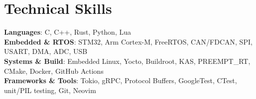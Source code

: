 \documentclass[letterpaper,11pt]{article}
\begin{document}
\section{Technical Skills}
\begin{itemize}[leftmargin=0.15in, label={}]
	\small{\item{
		      \textbf{Languages}{: C, C++, Rust, Python, Lua} \\
		      \textbf{Embedded \& RTOS}{: STM32, Arm Cortex-M, FreeRTOS, CAN/FDCAN, SPI, USART, DMA, ADC, USB} \\
		      \textbf{Systems \& Build}{: Embedded Linux, Yocto, Buildroot, KAS, PREEMPT\_RT, CMake, Docker, GitHub Actions} \\
		      \textbf{Frameworks \& Tools}{: Tokio, gRPC, Protocol Buffers, GoogleTest, CTest, unit/PIL testing, Git, Neovim}
	      }}
\end{itemize}

\end{document}
